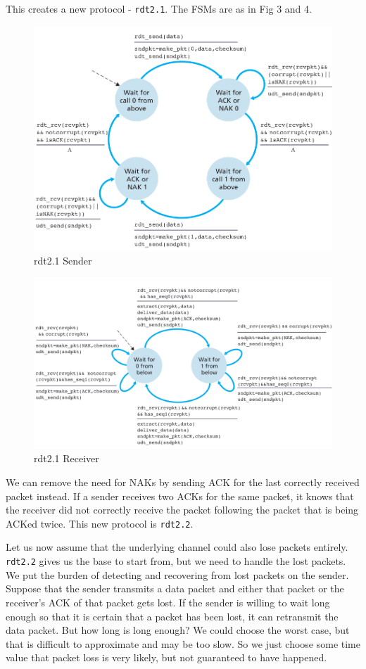 \documentclass[12pt,letterpaper]{book}
\theoremstyle{definition}
\begin{document}
This creates a new protocol - \texttt{rdt2.1}. The FSMs are as in Fig 3 and 4.

\begin{figure}[htpb]
  \centering
  \includegraphics[width=0.8\linewidth]{./assets/rdt2-1_sender.png}
  \caption{rdt2.1 Sender}%
  \label{fig:name}
\end{figure}

\begin{figure}[htpb]
  \centering
  \includegraphics[width=0.8\linewidth]{./assets/rdt2-1_rcvr.png}
  \caption{rdt2.1 Receiver}%
  \label{fig:./assets}
\end{figure}

We can remove the need for NAKs by sending ACK for the last correctly received packet instead. If a sender receives two ACKs for the same packet, it knows that the receiver did not correctly receive the packet following the packet that is being ACKed twice. This new protocol is \texttt{rdt2.2}.

Let us now assume that the underlying channel could also lose packets entirely. \texttt{rdt2.2} gives us the base to start from, but we need to handle the lost packets. We put the burden of detecting and recovering from lost packets on the sender. Suppose that the sender transmits a data packet and either that packet or the receiver's ACK of that packet gets lost. If the sender is willing to wait long enough so that it is certain that a packet has been lost, it can retransmit the data packet. But how long is long enough? We could choose the worst case, but that is difficult to approximate and may be too slow. So we just choose some time value that packet loss is very likely, but not guaranteed to have happened.
\end{document}
